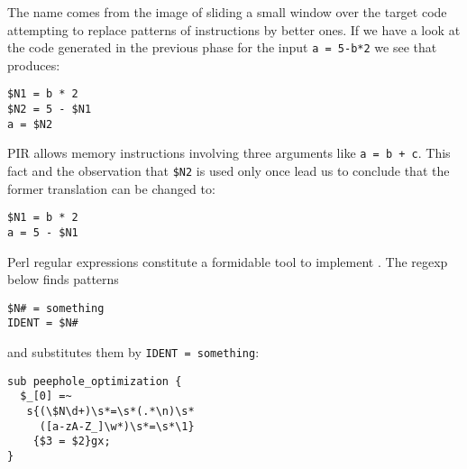 The name  comes from
the image of sliding a small window 
over the target code attempting to 
replace patterns of instructions 
by better ones. If we have a look at the code 
generated in the previous phase for the input
\verb|a = 5-b*2|
we see that produces:
\begin{verbatim}
$N1 = b * 2
$N2 = 5 - $N1
a = $N2
\end{verbatim}
PIR allows memory instructions involving 
three arguments like \verb|a = b + c|.
This fact and the observation that \verb|$N2| 
is used only once 
lead us to conclude that 
the former translation can be changed to:
\begin{verbatim}
$N1 = b * 2
a = 5 - $N1
\end{verbatim}
Perl regular expressions constitute a formidable
tool to implement . The
regexp below finds patterns 
\begin{verbatim}
$N# = something
IDENT = $N#
\end{verbatim}
and substitutes them by \verb|IDENT = something|:
\begin{verbatim}
sub peephole_optimization {
  $_[0] =~ 
   s{(\$N\d+)\s*=\s*(.*\n)\s*
     ([a-zA-Z_]\w*)\s*=\s*\1}
    {$3 = $2}gx;
}
\end{verbatim}
